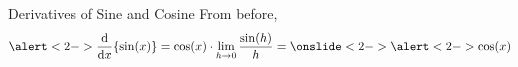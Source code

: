 \begin{frame}[t]{Derivatives of Sine and Cosine}
From before,
\[\alert<2->{\diff{}{x}\{\sin(x)\}} = \cos(x)\cdot \lim_{h \rightarrow 0 }\frac{\sin(h)}{h} = \onslide<2->{\alert<2->{\cos(x)}}\]

%
%

\end{frame}

